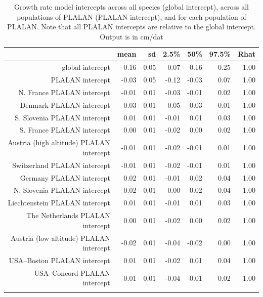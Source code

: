 \documentclass[12pt]{article}\usepackage[]{graphicx}\usepackage[]{color}
\begin{document}
\begin{longtable}{rrrrrrr}
\caption{Growth rate model intercepts across all species (global intercept), across all populations of PLALAN (PLALAN intercept), and for each population of PLALAN. Note that all PLALAN intercepts are relative to the global intercept.  Output is in cm/dat} \\ 
  & mean & sd & 2.5\% & 50\% & 97.5\% & Rhat \\ 
  \hline
global intercept & 0.16 & 0.05 & 0.07 & 0.16 & 0.25 & 1.00 \\ 
  PLALAN intercept & -0.03 & 0.05 & -0.12 & -0.03 & 0.07 & 1.00 \\ 
  N. France PLALAN intercept & -0.01 & 0.01 & -0.03 & -0.01 & 0.02 & 1.00 \\ 
  Denmark PLALAN intercept & -0.03 & 0.01 & -0.05 & -0.03 & -0.01 & 1.00 \\ 
  S. Slovenia PLALAN intercept & 0.01 & 0.01 & -0.01 & 0.01 & 0.03 & 1.00 \\ 
  S. France PLALAN intercept & 0.00 & 0.01 & -0.02 & 0.00 & 0.02 & 1.00 \\ 
  Austria (high altitude) PLALAN intercept & -0.01 & 0.01 & -0.02 & -0.01 & 0.01 & 1.00 \\ 
  Switzerland PLALAN intercept & -0.01 & 0.01 & -0.02 & -0.01 & 0.01 & 1.00 \\ 
  Germany PLALAN intercept & 0.02 & 0.01 & -0.01 & 0.02 & 0.04 & 1.00 \\ 
  N. Slovenia PLALAN intercept & 0.02 & 0.01 & 0.00 & 0.02 & 0.04 & 1.00 \\ 
  Liechtenstein PLALAN intercept & 0.01 & 0.01 & -0.01 & 0.01 & 0.03 & 1.00 \\ 
  The Netherlands PLALAN intercept & 0.00 & 0.01 & -0.02 & 0.00 & 0.02 & 1.00 \\ 
  Austria (low altitude) PLALAN intercept & -0.02 & 0.01 & -0.04 & -0.02 & 0.00 & 1.00 \\ 
  USA--Boston PLALAN intercept & 0.01 & 0.01 & -0.02 & 0.01 & 0.04 & 1.00 \\ 
  USA--Concord PLALAN intercept & -0.01 & 0.01 & -0.04 & -0.01 & 0.02 & 1.00 \\ 
  \hline
\label{tab:mod_gr_intercept}
\end{longtable}
\end{document}
